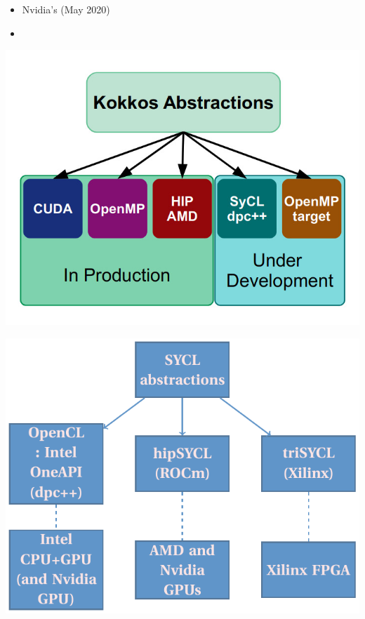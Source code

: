 \begin{frame}
\begin{minipage}{0.73\linewidth}
\begin{itemize}
{\begin{itemize}
          \begin{itemize}
          \item Nvidia's  (May 2020)
          \item {}
          \end{itemize}
        \end{itemize}
      }
    \end{itemize}
  \end{minipage}
  \begin{minipage}{0.26\linewidth}
    \includegraphics[width=1.3\linewidth]{./images/exascale/kokkos_backends}

    \includegraphics[width=1.3\linewidth]{./tikz/sycl}


\end{minipage}
\end{frame}
